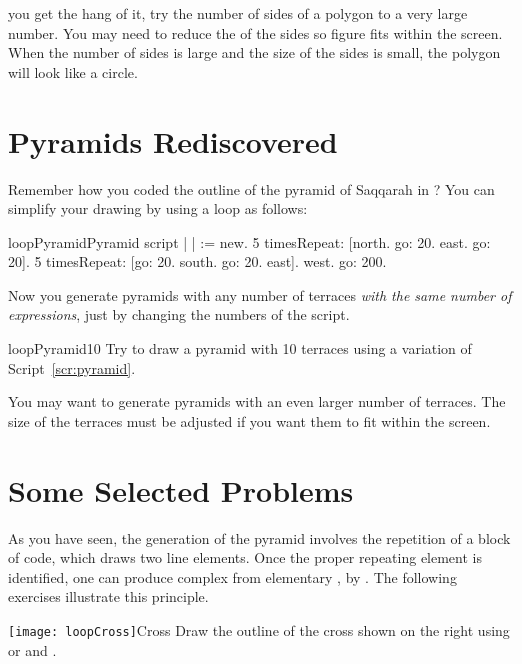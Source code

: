  you get the hang of it, try  the number of sides of a
polygon to a very large number. You may need to reduce the  of
the sides so  figure fits within the screen. When the
number of sides is large and 
 the size of the sides is small, the
polygon will look like a circle.


\section{Pyramids Rediscovered}\label{sec:bouclonpyramids}
Remember how you coded the outline of the pyramid of Saqqarah in
? You can simplify your drawing by using a loop 
as follows:

\begin{scriptfig}{loopPyramid}{Pyramid script} \label{scr:pyramid}
| \caro |
\caro := \Turtle new.
5 timesRepeat: 
     [\caro north.
     \caro go: 20.
     \caro east.
     \caro go: 20].
5 timesRepeat: 
     [\caro go: 20.
     \caro south.
     \caro go: 20.
     \caro east].
\caro west.
\caro go: 200.
\end{scriptfig}

Now you  generate pyramids with any number of
terraces \emph{with the same number of expressions}, just by changing
the numbers of the script.

\begin{exofig}{loopPyramid10} \label{exo:pyramid}
Try to draw a pyramid with 10 terraces using a variation of Script~\ref{scr:pyramid}.
\end{exofig}

You may want to generate pyramids with an even larger number of
terraces. The size of the terraces must be adjusted if you want
them to fit within the screen.

\section{Some Selected Problems}
As you have seen, the generation of the pyramid involves the
repetition of a block of code, which draws two line elements. Once the
proper repeating element is identified, one can produce complex
 from elementary , by .  The
following exercises illustrate this principle.

\begin{exofigwithsizeandtitle}{\texttt{[image: loopCross]}}{Cross} \label{exo:redcross}
Draw the outline of the cross shown on the right using \turnLeft or \turnRight and
\timesRepeat.
\end{exofigwithsizeandtitle}


